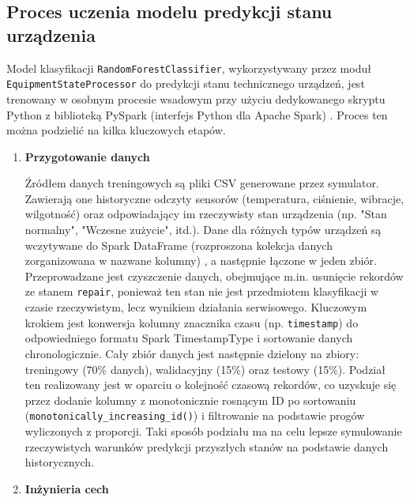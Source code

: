 \subsection{Proces uczenia modelu predykcji stanu urządzenia}
\label{sec:uczenie_modelu_stanu}

Model klasyfikacji \texttt{RandomForestClassifier}, wykorzystywany przez moduł \\
\texttt{EquipmentStateProcessor} do predykcji stanu technicznego urządzeń, jest trenowany w osobnym procesie wsadowym przy użyciu dedykowanego skryptu Python z biblioteką PySpark (interfejs Python dla Apache Spark) \cite{pyspark_docs}. Proces ten można podzielić na kilka kluczowych etapów.

\begin{enumerate}

    \item \textbf{Przygotowanie danych}

Źródłem danych treningowych są pliki CSV generowane przez symulator. Zawierają one historyczne odczyty sensorów (temperatura, ciśnienie, wibracje, wilgotność) oraz odpowiadający im rzeczywisty stan urządzenia (np. "Stan normalny", "Wczesne zużycie", itd.). Dane dla różnych typów urządzeń są wczytywane do Spark DataFrame (rozproszona kolekcja danych zorganizowana w nazwane kolumny) \cite{spark_dataframe} , a następnie łączone w jeden zbiór. Przeprowadzane jest czyszczenie danych, obejmujące m.in. usunięcie rekordów ze stanem \texttt{repair}, ponieważ ten stan nie jest przedmiotem klasyfikacji w czasie rzeczywistym, lecz wynikiem działania serwisowego. Kluczowym krokiem jest konwersja kolumny znacznika czasu (np. \texttt{timestamp}) do odpowiedniego formatu Spark TimestampType i sortowanie danych chronologicznie. Cały zbiór danych jest następnie dzielony na zbiory: treningowy (70\% danych), walidacyjny (15\%) oraz testowy (15\%). Podział ten realizowany jest w oparciu o kolejność czasową rekordów, co uzyskuje się przez dodanie kolumny z monotonicznie rosnącym ID po sortowaniu (\texttt{monotonically\_increasing\_id()}) i filtrowanie na podstawie progów wyliczonych z proporcji. Taki sposób podziału ma na celu lepsze symulowanie rzeczywistych warunków predykcji przyszłych stanów na podstawie danych historycznych.

 \item \textbf{Inżynieria cech}


\end{enumerate}
